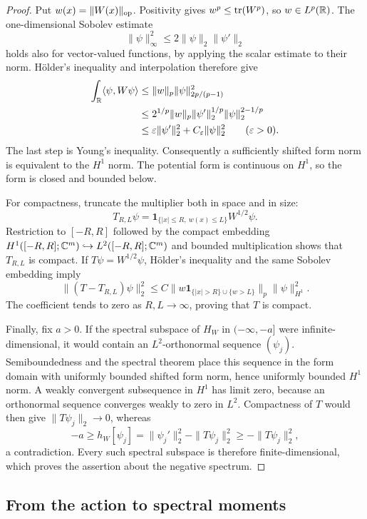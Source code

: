 \begin{proof}
Put $w(x)=\|W(x)\|_{\operatorname{op}}$.  Positivity gives
$w^p\leq\operatorname{tr}(W^p)$, so $w\in L^p(\mathbb R)$.  The one-dimensional Sobolev estimate
\[
 \|\psi\|_\infty^2\leq2\|\psi\|_2\|\psi'\|_2
\]
holds also for vector-valued functions, by applying the scalar estimate to
their norm.  H\"older's inequality and interpolation therefore give
\begin{align}
 \int_\mathbb R\langle\psi,W\psi\rangle
 &\leq\|w\|_p\|\psi\|_{2p/(p-1)}^2 \notag\\
 &\leq 2^{1/p}\|w\|_p
           \|\psi'\|_2^{1/p}\|\psi\|_2^{2-1/p} \notag\\
 &\leq\varepsilon\|\psi'\|_2^2+C_\varepsilon\|\psi\|_2^2
 \qquad(\varepsilon>0).                            \label{eq:form-bound}
\end{align}
The last step is Young's inequality.  Consequently a sufficiently shifted
form norm is equivalent to the $H^1$ norm.  The potential form is continuous
on $H^1$, so the form is closed and bounded below.

For compactness, truncate the multiplier both in space and in size:
\[
 T_{R,L}\psi
   =\mathbf1_{\{|x|\leq R,\ w(x)\leq L\}}W^{1/2}\psi.
\]
Restriction to $[-R,R]$ followed by the compact embedding
$H^1([-R,R];\mathbb C^m)\hookrightarrow L^2([-R,R];\mathbb C^m)$ and bounded
multiplication shows that $T_{R,L}$ is compact.  If $T\psi=W^{1/2}\psi$,
H\"older's inequality and the same Sobolev embedding imply
\[
 \|(T-T_{R,L})\psi\|_2^2
 \leq C\big\|w\mathbf1_{\{|x|>R\}\cup\{w>L\}}\big\|_p
           \|\psi\|_{H^1}^2.
\]
The coefficient tends to zero as $R,L\to\infty$, proving that $T$ is compact.

Finally, fix $a>0$.  If the spectral subspace of $H_W$ in $(-\infty,-a]$
were infinite-dimensional, it would contain an $L^2$-orthonormal sequence
$(\psi_j)$.  Semiboundedness and the spectral theorem place this sequence in
the form domain with uniformly bounded shifted form norm, hence uniformly
bounded $H^1$ norm.  A weakly convergent subsequence in $H^1$ has limit zero,
because an orthonormal sequence converges weakly to zero in $L^2$.
Compactness of $T$ would then give $\|T\psi_j\|_2\to0$, whereas
\[
 -a\geq h_W[\psi_j]
     =\|\psi_j'\|_2^2-\|T\psi_j\|_2^2
     \geq-\|T\psi_j\|_2^2,
\]
a contradiction.  Every such spectral subspace is therefore finite-dimensional,
which proves the assertion about the negative spectrum.
\end{proof}

\subsection{From the action to spectral moments}

